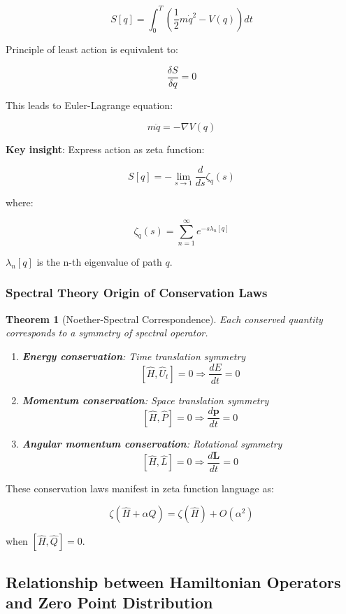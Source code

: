 \documentclass[12pt,a4paper]{article}
\newtheorem{theorem}{Theorem}[section]
\begin{document}
$$S[q] = \int_0^T \left(\frac{1}{2}m\dot{q}^2 - V(q)\right) dt$$

Principle of least action is equivalent to:

$$\frac{\delta S}{\delta q} = 0$$

This leads to Euler-Lagrange equation:

$$m\ddot{q} = -\nabla V(q)$$

\textbf{Key insight}: Express action as zeta function:

$$S[q] = -\lim_{s \to 1} \frac{d}{ds} \zeta_q(s)$$

where:

$$\zeta_q(s) = \sum_{n=1}^{\infty} e^{-s \lambda_n[q]}$$

$\lambda_n[q]$ is the n-th eigenvalue of path $q$.

\subsubsection{Spectral Theory Origin of Conservation Laws}

\begin{theorem}[Noether-Spectral Correspondence]
Each conserved quantity corresponds to a symmetry of spectral operator.

\begin{enumerate}
\item \textbf{Energy conservation}: Time translation symmetry
   $$[\hat{H}, \hat{U}_t] = 0 \Rightarrow \frac{dE}{dt} = 0$$

\item \textbf{Momentum conservation}: Space translation symmetry
   $$[\hat{H}, \hat{P}] = 0 \Rightarrow \frac{d\mathbf{p}}{dt} = 0$$

\item \textbf{Angular momentum conservation}: Rotational symmetry
   $$[\hat{H}, \hat{L}] = 0 \Rightarrow \frac{d\mathbf{L}}{dt} = 0$$
\end{enumerate}
\end{theorem}

These conservation laws manifest in zeta function language as:

$$\zeta(\hat{H} + \alpha \hat{Q}) = \zeta(\hat{H}) + O(\alpha^2)$$

when $[\hat{H}, \hat{Q}] = 0$.

\subsection{Relationship between Hamiltonian Operators and Zero Point Distribution}
\end{document}
